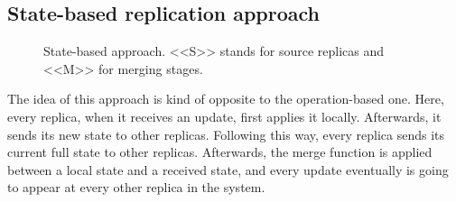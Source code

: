 \subsection*{State-based replication approach}

\begin{figure}[!htb]
    \begin{center}
    \def\svgwidth{\linewidth}
    
    \caption {State-based approach\cite{2}. <<S>> stands for source replicas and <<M>> for merging stages.}
    \label{fig:theory2}
\end{center}
\end{figure}

The idea of this approach is kind of opposite to the operation-based one. Here, every replica, when it receives an update, first applies it locally. Afterwards, it sends its new state to other replicas. Following this way, every replica sends its current full state to other replicas. Afterwards, the merge function is applied between a local state and a received state, and every update eventually is going to appear at every other replica in the system. 